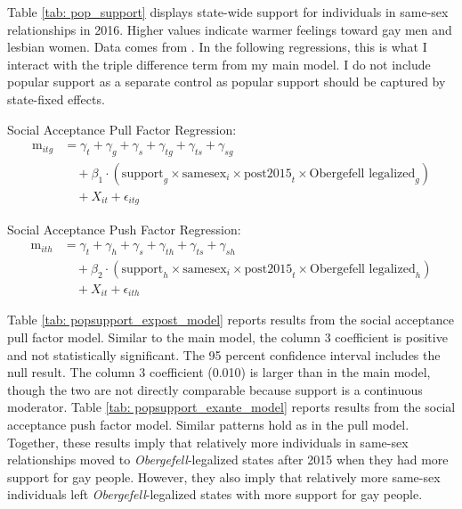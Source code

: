 \documentclass[12pt,letterpaper]{article}
\begin{document}


Table \ref{tab: pop_support} displays state-wide support for individuals in same-sex relationships in 2016. Higher values indicate warmer feelings toward gay men and lesbian women. Data comes from \citet{29}. In the following regressions, this is what I interact with the triple difference term from my main model. I do not include popular support as a separate control as popular support should be captured by state-fixed effects.

\hfill
\break
Social Acceptance Pull Factor Regression:
\begin{equation}
\begin{aligned}
\text{m}_{itg} &= \gamma_t + \gamma_g + \gamma_s + \gamma_{tg} + \gamma_{ts} + \gamma_{sg} \\
&\quad + \beta_1 \cdot (\text{support}_g \times \text{samesex}_i \times \text{post2015}_t \times \text{Obergefell legalized}_g) \\
&\quad + X_{it} + \epsilon_{itg}
\end{aligned}
\end{equation}

\hfill
\break
Social Acceptance Push Factor Regression:
\begin{equation}
\begin{aligned}
\text{m}_{ith} &= \gamma_t + \gamma_h + \gamma_s + \gamma_{th} + \gamma_{ts} + \gamma_{sh} \\
&\quad + \beta_2 \cdot (\text{support}_h \times \text{samesex}_i \times \text{post2015}_t \times \text{Obergefell legalized}_h) \\
&\quad + X_{it} + \epsilon_{ith}
\end{aligned}
\end{equation}

Table \ref{tab: popsupport_expost_model} reports results from the social acceptance pull factor model. Similar to the main model, the column 3 coefficient is positive and not statistically significant. The 95 percent confidence interval includes the null result. The column 3 coefficient (0.010) is larger than in the main model, though the two are not directly comparable because support is a continuous moderator. Table \ref{tab: popsupport_exante_model} reports results from the social acceptance push factor model. Similar patterns hold as in the pull model. Together, these results imply that relatively more individuals in same-sex relationships moved to \textit{Obergefell}-legalized states after 2015 when they had more support for gay people. However, they also imply that relatively more same-sex individuals left \textit{Obergefell}-legalized states with more support for gay people. 
\end{document}
